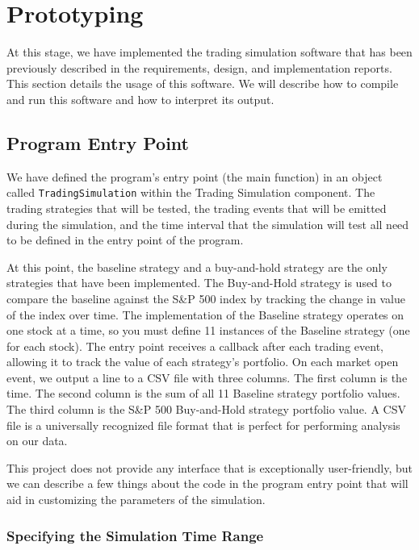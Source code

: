 
\section{Prototyping}

At this stage, we have implemented the trading simulation software that has been previously described in the requirements, design, and implementation reports. This section details the usage of this software. We will describe how to compile and run this software and how to interpret its output.

\subsection{Program Entry Point}

We have defined the program's entry point (the main function) in an object called \texttt{TradingSimulation} within the Trading Simulation component. The trading strategies that will be tested, the trading events that will be emitted during the simulation, and the time interval that the simulation will test all need to be defined in the entry point of the program.

At this point, the baseline strategy and a buy-and-hold strategy are the only strategies that have been implemented. The Buy-and-Hold strategy is used to compare the baseline against the S\&P 500 index by tracking the change in value of the index over time. The implementation of the Baseline strategy operates on one stock at a time, so you must define 11 instances of the Baseline strategy (one for each stock). The entry point receives a callback after each trading event, allowing it to track the value of each strategy's portfolio. On each market open event, we output a line to a CSV file with three columns. The first column is the time. The second column is the sum of all 11 Baseline strategy portfolio values. The third column is the S\&P 500 Buy-and-Hold strategy portfolio value. A CSV file is a universally recognized file format that is perfect for performing analysis on our data.

This project does not provide any interface that is exceptionally user-friendly, but we can describe a few things about the code in the program entry point that will aid in customizing the parameters of the simulation.

\subsubsection{Specifying the Simulation Time Range}


